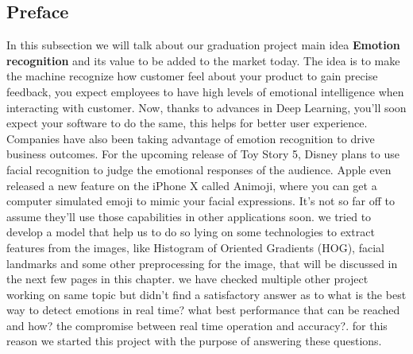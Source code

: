 \subsection{Preface}

In this subsection we will talk about our graduation project main idea
\textbf{Emotion recognition} and its value to be added to the market today.
\newline
The idea is to make the machine recognize how customer feel about your product to gain precise feedback, you expect employees to have high levels of emotional intelligence when interacting with customer. Now, thanks to advances in Deep Learning, you’ll soon expect your software to do the same, this helps for better user experience.
\bigbreak
Companies have also been taking advantage of emotion recognition to drive business outcomes. For the upcoming release of Toy Story 5, Disney plans to use facial recognition to judge the emotional responses of the audience. Apple even released a new feature on the iPhone X called Animoji, where you can get a computer simulated emoji to mimic your facial expressions. It’s not so far off to assume they’ll use those capabilities in other applications soon.
\bigbreak
we tried to develop a model that help us to do so lying on some technologies to extract features from the images, like Histogram of Oriented Gradients (HOG), facial landmarks and some other preprocessing for the image, that will be discussed in the next few pages in this chapter.\newline
we have checked multiple other project working on same topic but didn't find a satisfactory answer as to what is the best way to detect emotions in real time? what best performance that can be reached and how? the compromise between real time operation and accuracy?.
for this reason we started this project with the purpose of answering these questions.
\newpage

